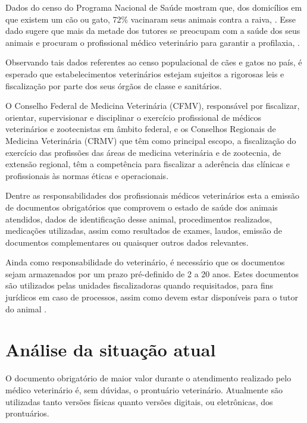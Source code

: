 \documentclass[
    12pt,               %
    openright,          %
    oneside,
    a4paper,            %
    BIBLATEX,           %
    TODO,               %
    english,            %
    brazil              %
    ]{ifsp-spo-inf-ctds}
\begin{document}
    Dados do censo do Programa Nacional de Saúde mostram que, dos domicílios em que existem um cão ou gato, 72\% vacinaram seus animais contra a raiva,
    . Esse dado sugere que mais da metade dos tutores se preocupam com a saúde dos seus animais e procuram o profissional médico veterinário para garantir a profilaxia, .
     
    Observando tais dados referentes ao censo populacional de cães e gatos no país, é esperado que estabelecimentos veterinários estejam sujeitos a rigorosas leis e fiscalização por parte dos seus órgãos de classe e sanitários.
    
    O Conselho Federal de Medicina Veterinária (CFMV), responsável por fiscalizar, orientar, supervisionar e disciplinar o exercício profissional de médicos veterinários e zootecnistas em âmbito federal, e os Conselhos Regionais de Medicina Veterinária (CRMV) que têm como principal escopo, a fiscalização do exercício das profissões das áreas de medicina veterinária e de zootecnia, de extensão regional,  têm a competência para fiscalizar a aderência das clínicas e profissionais às normas éticas e operacionais.
     
    Dentre as responsabilidades dos profissionais médicos veterinários esta a emissão de documentos obrigatórios que comprovem o estado de saúde dos animais atendidos, dados de identificação desse animal, procedimentos realizados, medicações utilizadas, assim como resultados de exames, laudos, emissão de documentos complementares ou quaisquer outros dados relevantes.
    
    Ainda como responsabilidade do veterinário, é necessário que os documentos sejam armazenados por um prazo pré-definido de 2 a 20 anos. Estes documentos são utilizados pelas unidades fiscalizadoras quando requisitados, para fins jurídicos em caso de processos, assim como devem estar disponíveis para o tutor do animal .

    \section{Análise da situação atual} \label{analise_atual}
    
    O documento obrigatório de maior valor durante o atendimento realizado pelo médico veterinário é, sem dúvidas, o prontuário veterinário. Atualmente são utilizadas tanto versões físicas quanto versões digitais, ou eletrônicas, dos prontuários.
    
\end{document}
